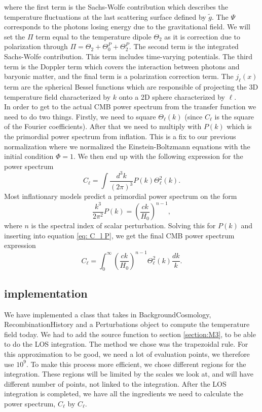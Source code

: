 \documentclass{aa}
\begin{document}
where the first term is the Sachs-Wolfe contribution which describes the temperature fluctuations at the last scattering surface defined by $\tilde{g}$. The $\Psi$ corresponds to the photons losing energy due to the gravitational field. We will set the $\Pi$ term equal to the temperature dipole $\Theta_2$ as it is correction due to polarization through $\Pi = \Theta_2 + \Theta^P_0 + \Theta^P_2$. The second term is the integrated Sachs-Wolfe contribution. This term includes time-varying potentials. The third term is the Doppler term which covers the interaction between photons and baryonic matter, and the final term is a polarization correction term. The $j_\ell(x)$ term are the spherical Bessel functions which are responsible of projecting the 3D temperature field characterized by $k$ onto a 2D sphere characterized by $\ell$.\\

In order to get to the actual CMB power spectrum from the transfer function we need to do two things. Firstly, we need to square $\Theta_\ell(k)$ (since $C_\ell$ is the square of the Fourier coefficients). After that we need to multiply with $P(k)$ which is the primordial power spectrum from inflation. This is a fix to our previous normalization where we normalized the Einstein-Boltzmann equations with the initial condition $\Phi = 1$. We then end up with the following expression for the power spectrum
\begin{equation}\label{eq: C_l P}
    C_{\ell}=\int \frac{d^{3} k}{(2 \pi)^{3}} P(k) \Theta_{\ell}^{2}(k).
\end{equation}
Most inflationary models predict a primordial power spectrum on the form
\begin{equation}
\frac{k^{3}}{2 \pi^{2}} P(k)=\left(\frac{c k}{H_{0}}\right)^{n-1},
\end{equation}
where $n$ is the spectral index of scalar perturbation. Solving this for $P(k)$ and inserting into equation \eqref{eq: C_l P}, we get the final CMB power spectrum expression 
\begin{equation}
    C_{\ell}=\int_{0}^{\infty}\left(\frac{c k}{H_{0}}\right)^{n-1} \Theta_{\ell}^{2}(k) \frac{d k}{k}.
\end{equation}


\subsection{implementation}
We have implemented a class that takes in BackgroundCosmology, RecombinationHistory and a Perturbations object to compute the temperature field today. We had to add the source function to section \ref{section:M3}, to be able to do the LOS integration. The method we chose was the trapezoidal rule. For this approximation to be good, we need a lot of evaluation points, we therefore use $10^9$. To make this process more efficient, we chose different regions for the integration. These regions will be limited by the scales we look at, and will have different number of points, not linked to the integration. After the LOS integration is completed, we have all the ingredients we need to calculate the power spectrum, $C_\ell$ by $C_\ell$.
\end{document}

